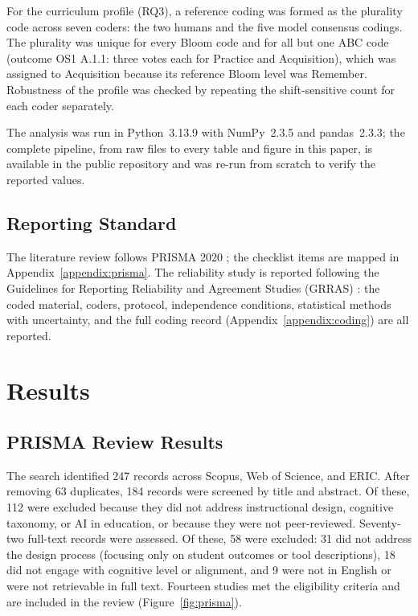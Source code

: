 \documentclass[journal,article,submit,pdftex,moreauthors]{Definitions/mdpi}
\begin{document}
For the curriculum profile (RQ3), a reference coding was formed as the plurality code across seven coders: the two humans and the five model consensus codings. The plurality was unique for every Bloom code and for all but one ABC code (outcome OS1 A.1.1: three votes each for Practice and Acquisition), which was assigned to Acquisition because its reference Bloom level was Remember. Robustness of the profile was checked by repeating the shift-sensitive count for each coder separately.

The analysis was run in Python~3.13.9 with NumPy~2.3.5 and pandas~2.3.3; the complete pipeline, from raw files to every table and figure in this paper, is available in the public repository and was re-run from scratch to verify the reported values.

\subsection{Reporting Standard}

The literature review follows PRISMA 2020 \cite{page_prisma_2021}; the checklist items are mapped in Appendix~\ref{appendix:prisma}. The reliability study is reported following the Guidelines for Reporting Reliability and Agreement Studies (GRRAS) \cite{kottner_grras_2011}: the coded material, coders, protocol, independence conditions, statistical methods with uncertainty, and the full coding record (Appendix~\ref{appendix:coding}) are all reported.

\section{Results}
\label{sec:results}

\subsection{PRISMA Review Results}
\label{sec:prisma_results}

The search identified 247 records across Scopus, Web of Science, and ERIC. After removing 63 duplicates, 184 records were screened by title and abstract. Of these, 112 were excluded because they did not address instructional design, cognitive taxonomy, or AI in education, or because they were not peer-reviewed. Seventy-two full-text records were assessed. Of these, 58 were excluded: 31 did not address the design process (focusing only on student outcomes or tool descriptions), 18 did not engage with cognitive level or alignment, and 9 were not in English or were not retrievable in full text. Fourteen studies met the eligibility criteria and are included in the review (Figure~\ref{fig:prisma}).
\end{document}
